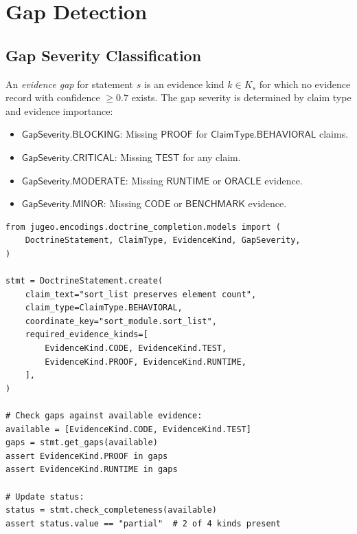 \documentclass[11pt]{article}
\newcommand{\ClmType}{\mathsf{ClaimType}}
\newcommand{\GapSev}{\mathsf{GapSeverity}}
\begin{document}
\section{Gap Detection}\label{sec:gaps}

\subsection{Gap Severity Classification}

\begin{definition}\label{def:gap}
An \emph{evidence gap} for statement $s$ is an evidence kind $k \in K_s$
for which no evidence record with confidence $\geq 0.7$ exists.  The gap
severity is determined by claim type and evidence importance:
\begin{itemize}[leftmargin=2em]
  \item $\GapSev.\mathsf{BLOCKING}$: Missing $\mathsf{PROOF}$ for
        $\ClmType.\mathsf{BEHAVIORAL}$ claims.
  \item $\GapSev.\mathsf{CRITICAL}$: Missing $\mathsf{TEST}$ for any claim.
  \item $\GapSev.\mathsf{MODERATE}$: Missing $\mathsf{RUNTIME}$ or
        $\mathsf{ORACLE}$ evidence.
  \item $\GapSev.\mathsf{MINOR}$: Missing $\mathsf{CODE}$ or
        $\mathsf{BENCHMARK}$ evidence.
\end{itemize}
\end{definition}

\begin{lstlisting}[style=jugeo-python]
from jugeo.encodings.doctrine_completion.models import (
    DoctrineStatement, ClaimType, EvidenceKind, GapSeverity,
)

stmt = DoctrineStatement.create(
    claim_text="sort_list preserves element count",
    claim_type=ClaimType.BEHAVIORAL,
    coordinate_key="sort_module.sort_list",
    required_evidence_kinds=[
        EvidenceKind.CODE, EvidenceKind.TEST,
        EvidenceKind.PROOF, EvidenceKind.RUNTIME,
    ],
)

# Check gaps against available evidence:
available = [EvidenceKind.CODE, EvidenceKind.TEST]
gaps = stmt.get_gaps(available)
assert EvidenceKind.PROOF in gaps
assert EvidenceKind.RUNTIME in gaps

# Update status:
status = stmt.check_completeness(available)
assert status.value == "partial"  # 2 of 4 kinds present
\end{lstlisting}
\end{document}
